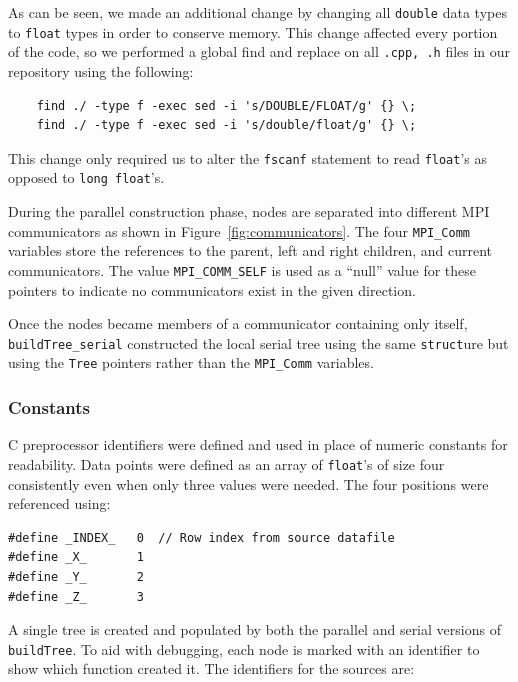 \documentclass{article}
\begin{document}
As can be seen, we made an additional change by changing all \texttt{double} data types to \texttt{float} types in order to conserve memory. This change affected every portion of the code, so we performed a global find and replace on all \texttt{.cpp, .h} files in our repository using the following:

\lstset{language=C++, keepspaces=true}
\begin{lstlisting}
	find ./ -type f -exec sed -i 's/DOUBLE/FLOAT/g' {} \;
	find ./ -type f -exec sed -i 's/double/float/g' {} \;
\end{lstlisting}

This change only required us to alter the \texttt{fscanf} statement to read \texttt{float}'s as opposed to \texttt{long float}'s.

During the parallel construction phase, nodes are separated into different MPI communicators as shown in Figure~\ref{fig:communicators}. The four \texttt{MPI\_Comm} variables store the references to the parent, left and right children, and current communicators. The value \texttt{MPI\_COMM\_SELF} is used as a ``null'' value for these pointers to indicate no communicators exist in the given direction.

Once the nodes became members of a communicator containing only itself, \texttt{buildTree\_serial} constructed the local serial tree using the same \texttt{struct}ure but using the \texttt{Tree} pointers rather than the \texttt{MPI\_Comm} variables.


%
%

\subsubsection{Constants}\label{sec:constants}

C preprocessor identifiers were defined and used in place of numeric constants for readability. Data points were defined as an array of \texttt{float}'s of size four consistently even when only three values were needed. The four positions were referenced using:

\lstset{language=C++, keepspaces=true}
\begin{lstlisting}
#define _INDEX_   0  // Row index from source datafile
#define _X_       1
#define _Y_       2
#define _Z_       3
\end{lstlisting}

A single tree is created and populated by both the parallel and serial versions of \texttt{buildTree}. To aid with debugging, each node is marked with an identifier to show which function created it. The identifiers for the sources are:
\end{document}
